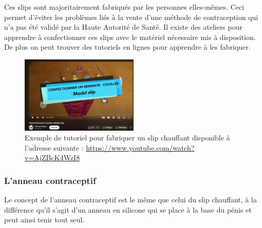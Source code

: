 \documentclass[12pt,a4paper]{report}
\begin{document}
Ces slips sont majoritairement fabriqués par les personnes elles-mêmes. Ceci permet d'éviter les problèmes liés à la vente d'une méthode de contraception qui n'a pas été validé par la Haute Autorité de Santé. \cite{MethodeThermique}\cite{guillaumedaudinContraceptesEnqueteDernier2022}
Il existe des ateliers pour apprendre à confectionner ces slips avec le matériel nécessaire mis à disposition. \cite{ContraceptionMasculineComment2023}\cite{guillaumedaudinContraceptesEnqueteDernier2022}
De plus on peut trouver des tutoriels en lignes pour apprendre à les fabriquer.

\begin{figure}[H]
    \centering
    \includegraphics[width=0.5\textwidth]{images/scientiphique/Tuto_slip_contraceptif.png}
    \caption{Exemple de tutoriel pour fabriquer un slip chauffant disponible à l'adresse suivante : \href{https://www.youtube.com/watch?v=AjZBcK4WzI8}{https://www.youtube.com/watch?v=AjZBcK4WzI8}}
    \label{fig:tuto_slip_chauffant}
\end{figure}

\subsubsection{L'anneau contraceptif}

Le concept de l'anneau contraceptif est le même que celui du slip chauffant, à la différence qu'il s'agit d'un anneau en silicone qui se place à la base du pénis et peut ainsi tenir tout seul.
\end{document}
